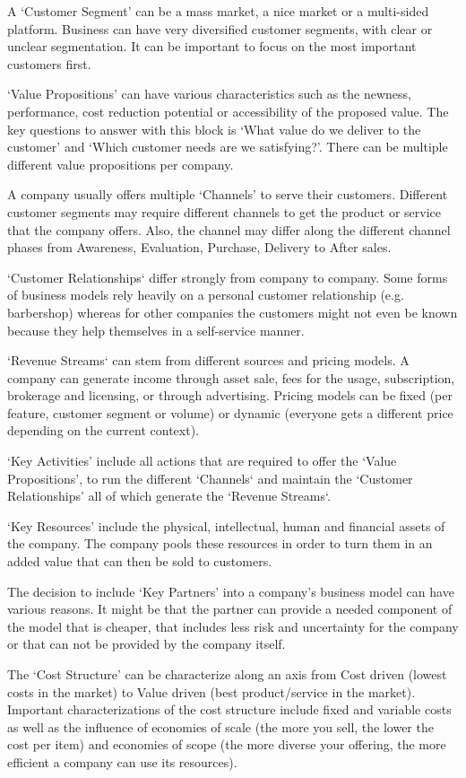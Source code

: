 		A `Customer Segment' can be a mass market, a nice market or a multi-sided platform. Business can have very diversified customer segments, with clear or unclear segmentation. It can be important to focus on the most important customers first.

		`Value Propositions' can have various characteristics such as the newness, performance, cost reduction potential or accessibility of the proposed value. The key questions to answer with this block is `What value do we deliver to the customer' and `Which customer needs are we satisfying?'. There can be multiple different value propositions per company.

		A company usually offers multiple `Channels' to serve their customers. Different customer segments may require different channels to get the product or service that the company offers. Also, the channel may differ along the different channel phases from Awareness, Evaluation, Purchase, Delivery to After sales.

		`Customer Relationships` differ strongly from company to company. Some forms of business models rely heavily on a personal customer relationship (e.g. barbershop) whereas for other companies the customers might not even be known because they help themselves in a self-service manner.

		`Revenue Streams` can stem from different sources and pricing models. A company can generate income through asset sale, fees for the usage, subscription, brokerage and licensing, or through advertising. Pricing models can be fixed (per feature, customer segment or volume) or dynamic (everyone gets a different price depending on the current context).
 
		`Key Activities' include all actions that are required to offer the `Value Propositions', to run the different `Channels` and maintain the `Customer Relationships' all of which generate the `Revenue Streams`.

		`Key Resources' include the physical, intellectual, human and financial assets of the company. The company pools these resources in order to turn them in an added value that can then be sold to customers.

		The decision to include `Key Partners' into a company's business model can have various reasons. It might be that the partner can provide a needed component of the model that is cheaper, that includes less risk and uncertainty for the company or that can not be provided by the company itself.

		The `Cost Structure' can be characterize along an axis from Cost driven (lowest costs in the market) to Value driven (best product/service in the market). Important characterizations of the cost structure include fixed and variable costs as well as the influence of economies of scale (the more you sell, the lower the cost per item) and economies of scope (the more diverse your offering, the more efficient a company can use its resources).	

